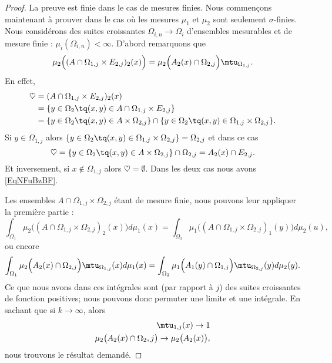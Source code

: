 \begin{proof}
	La preuve est finie dans le cas de mesures finies. Nous commençons maintenant à prouver dans le cas où les mesures \( \mu_1\) et \( \mu_2\) sont seulement \( \sigma\)-finies. Nous considérons des suites croissantes \( \Omega_{i,n}\to\Omega_i\) d'ensembles mesurables et de mesure finie : \( \mu_i(\Omega_{i,n})<\infty\). D'abord remarquons que
	\begin{equation}\label{EqNFuBzBF}
		\mu_2\Big( (A\cap \Omega_{1,j}\times E_{2,j})_2(x) \Big)=\mu_2\Big( A_2(x)\cap \Omega_{2,j} \Big)\mtu_{\Omega_{1,j}}.
	\end{equation}
	En effet,
	\begin{subequations}
		\begin{align}
			\heartsuit & =(A\cap\Omega_{1,j}\times E_{2,j})_2(x)                                                                                  \\
			           & =\{ y\in\Omega_2\tq (x,y)\in A\cap \Omega_{1,j}\times E_{2,j} \}                                                         \\
			           & =\{ y\in \Omega_2\tq (x,y)\in A\times \Omega_{2,j} \}\cap\{ y\in\Omega_2\tq (x,y)\in \Omega_{1,j}\times \Omega_{2,j} \}.
		\end{align}
	\end{subequations}
	Si \( y\in \Omega_{1,j}\) alors \( \{ y\in \Omega_2\tq (x,y)\in \Omega_{1,j}\times \Omega_{2,j} \}=\Omega_{2,j}\) et dans ce cas
	\begin{equation}
		\heartsuit=\{ y\in \Omega_2\tq (x,y)\in A\times \Omega_{2,j} \}\cap \Omega_{2,j}=A_2(x)\cap E_{2,j}.
	\end{equation}
	Et inversement, si \( x\notin \Omega_{1,j}\) alors \( \heartsuit=\emptyset\). Dans les deux cas nous avons \eqref{EqNFuBzBF}.

	Les ensembles \( A\cap \Omega_{1,j}\times \Omega_{2,j}\) étant de mesure finie, nous pouvons leur appliquer la première partie :
	\begin{equation}
		\int_{\Omega_1}\mu_2\Big( (A\cap\Omega_{1,j}\times \Omega_{2,j})_2(x) \Big)d\mu_1(x)=\int_{\Omega_2}\mu_1\Big( (A\cap\Omega_{1,j}\times \Omega_{2,j})_1(y) \Big)d\mu_2(u),
	\end{equation}
	ou encore
	\begin{equation}
		\int_{\Omega_1}\mu_2\Big( A_2(x)\cap \Omega_{2,j} \Big)\mtu_{\Omega_{1,j}}(x)d\mu_1(x)=\int_{\Omega_2}\mu_1\Big( A_1(y)\cap \Omega_{1,j} \Big)\mtu_{\Omega_{2,j}}(y)d\mu_2(y).
	\end{equation}
	Ce que nous avons dans ces intégrales sont (par rapport à \( j\)) des suites croissantes de fonction positives; nous pouvons donc permuter une limite et une intégrale. En sachant que si \( k\to \infty\), alors
	\begin{subequations}
		\begin{align}
			\mtu_{1,j}(x)\to 1 \\
			\mu_2\big( A_2(x)\cap \Omega_2,j \big)\to\mu_2\big( A_2(x) \big),
		\end{align}
	\end{subequations}
	nous trouvons le résultat demandé.
\end{proof}

